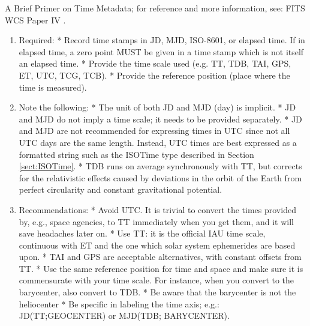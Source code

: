     A Brief Primer on Time Metadata; for reference and more information, see: FITS WCS Paper IV \citep{2015A+A...574A..36R}.
    \begin{enumerate}
    \item  Required:\newline
     * Record time stamps in JD, MJD, ISO-8601, or elapsed time. If in elapsed time, a zero point MUST be given in a time stamp which is not itself an elapsed time. \newline
     * Provide the time scale used (e.g. TT, TDB, TAI, GPS, ET, UTC, TCG, TCB). \newline
     * Provide the reference position (place where the time is measured).
    \item  Note the following:  \newline
     * The unit of both JD and MJD (day) is implicit.  \newline
     * JD and MJD do not imply a time scale; it needs to be provided separately.  \newline
     * JD and MJD are not recommended for expressing times in UTC since not all UTC days are the same length.  Instead, UTC times are best expressed as a formatted string such as the ISOTime type described in Section \ref{sect:ISOTime}. \newline
     * TDB runs on average synchronously with TT, but corrects for the relativistic effects caused by deviations in the orbit of the Earth from perfect circularity and constant gravitational potential. \newline
    \item Recommendations:  \newline
     * Avoid UTC. It is trivial to convert the times provided by, e.g., space agencies, to TT immediately when you get them, and it will save headaches later on.  \newline
     * Use TT: it is the official IAU time scale, continuous with ET and the one which solar system ephemerides are based upon.  \newline
     * TAI and GPS are acceptable alternatives, with constant offsets from TT.  \newline
     * Use the same reference position for time and space and make sure it is commensurate with your time scale. For instance, when you convert to the barycenter, also convert to TDB.  \newline
     * Be aware that the barycenter is not the heliocenter  \newline
     * Be specific in labeling the time axis; e.g.: JD(TT;GEOCENTER) or MJD(TDB; BARYCENTER).  \newline

\end{enumerate}
